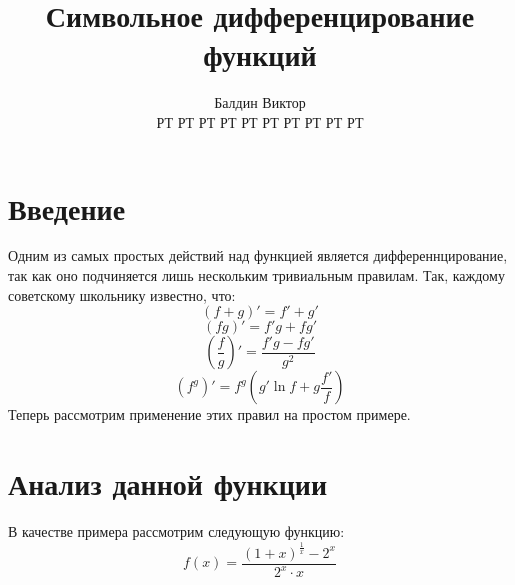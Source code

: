 \documentclass{article}
\title{Символьное дифференцирование функций}
\author{Балдин Виктор\\РТ РТ РТ РТ РТ РТ РТ РТ РТ РТ}
\begin{document}
\maketitle
\section{Введение}
Одним из самых простых действий над функцией является дифференнцирование, так как оно подчиняется лишь нескольким тривиальным правилам. Так, каждому советскому школьнику известно, что:
$$(f+g)'=f'+g'$$
$$(fg)' =f'g+fg'$$
$$\left(\frac{f}{g}\right)'=\frac{f'g-fg'}{g^2}$$
$$(f^g)'=f^g\left(g'\ln f+g\frac{f'}{f}\right)$$Теперь рассмотрим применение этих правил на простом примере.\section{Анализ данной функции}
В качестве примера рассмотрим следующую функцию:
$$f(x)=\frac{\left(1+x\right)^{\frac{1}{x}}-2^{x}}{2^{x} \cdot x}$$
\end{document}
